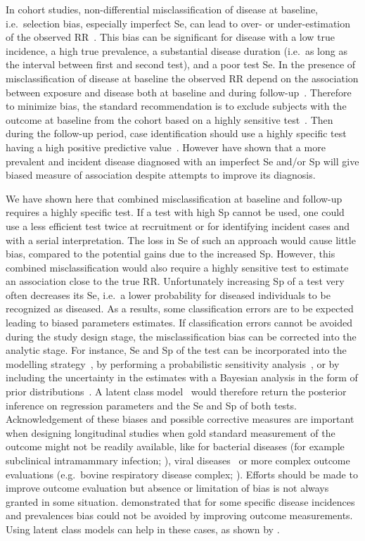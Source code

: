 In cohort studies, non-differential misclassification of disease at baseline,
i.e.\ selection bias, especially imperfect Se, can lead to over- or
under-estimation of the observed RR~\citep{Pekkanen2006}.
This bias can be significant for disease with a low true incidence, a high true
prevalence, a substantial disease duration (i.e.\ as long as the interval between
first and second test), and a poor test Se.
In the presence of misclassification of disease at baseline the observed RR
depend on the association between exposure and disease both at baseline and
during follow-up~\citep{Pekkanen2006}.
Therefore to minimize bias, the standard recommendation is to exclude subjects
with the outcome at baseline from the cohort based on a highly sensitive
test~\citep{Pekkanen2008}.
Then during the follow-up period, case identification should use a highly
specific test having a high positive predictive value~\citep{Brenner1993}.
However \cite{Haine2017} have shown that a more prevalent and incident disease
diagnosed with an imperfect Se and/or Sp will give biased measure of association
despite attempts to improve its diagnosis.

We have shown here that combined misclassification at baseline and follow-up
requires a highly specific test.
If a test with high Sp cannot be used, one could use a less efficient test twice
at recruitment or for identifying incident cases and with a serial
interpretation.
The loss in Se of such an approach would cause little bias, compared to the
potential gains due to the increased Sp.
However, this combined misclassification would also require a highly sensitive
test to estimate an association close to the true RR.
Unfortunately increasing Sp of a test very often decreases its Se, i.e.\ a lower
probability for diseased individuals to be recognized as diseased.
As a results, some classification errors are to be expected leading to biased
parameters estimates.
If classification errors cannot be avoided during the study design stage, the
misclassification bias can be corrected into the analytic stage.
For instance, Se and Sp of the test can be incorporated into the modelling
strategy~\citep{Magder1997}, by performing a probabilistic sensitivity
analysis~\citep{Fox_2005}, or by including the uncertainty in the estimates with
a Bayesian analysis in the form of prior distributions~\citep{McInturff2004}.
A latent class model~\citep{Hui1980} would therefore return the posterior
inference on regression parameters and the Se and Sp of both tests.
Acknowledgement of these biases and possible corrective measures are important
when designing longitudinal studies when gold standard measurement of the
outcome might not be readily available, like for bacterial diseases (for example
subclinical intramammary infection; \citealp{Koop2013}), viral
diseases~\citep{Dotti2013} or more complex outcome evaluations (e.g.\ bovine
respiratory disease complex; \citealp{Buczinski2015}).
Efforts should be made to improve outcome evaluation but absence or limitation of
bias is not always granted in some situation.
\cite{Haine2017} demonstrated that for some specific disease incidences and
prevalences bias could not be avoided by improving outcome measurements.
Using latent class models can help in these cases, as shown by \cite{Dufour2012}.

